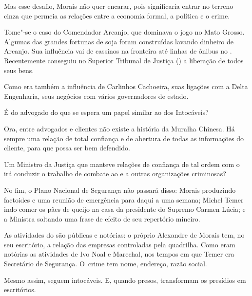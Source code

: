 Mas esse desafio, Morais não quer encarar, pois significaria entrar no
terreno cinza que permeia as relações entre a economia formal, a
política e o crime.

Tome"-se o caso do Comendador Arcanjo, que dominava o jogo no Mato
Grosso. Algumas das grandes fortunas de soja foram construídas lavando
dinheiro de Arcanjo. Sua influência vai de cassinos na fronteira até
linhas de ônibus no . Recentemente conseguiu no Superior Tribunal de
Justiça () a liberação de todos seus bens.

Como era também a influência de Carlinhos Cachoeira, suas ligações com a
Delta Engenharia, seus negócios com vários governadores de estado.

É do advogado do  que se espera um papel similar ao dos Intocáveis?

Ora, entre advogados e clientes não existe a história da Muralha
Chinesa. Há sempre uma relação de total confiança e de abertura de todas
as informações do cliente, para que possa ser bem defendido.

Um Ministro da Justiça que manteve relações de confiança de tal ordem
com o  irá conduzir o trabalho de combate ao  e a outras
organizações criminosas?

No fim, o Plano Nacional de Segurança não passará disso: Morais
produzindo factoides e uma reunião de emergência para daqui a uma
semana; Michel Temer indo comer os pães de queijo na casa da presidente
do Supremo Carmen Lúcia; e a Ministra soltando uma frase de efeito de
seu repertório mineiro.

As atividades do  são públicas e notórias: o próprio Alexandre de
Morais tem, no seu escritório, a relação das empresas controladas pela
quadrilha. Como eram notórias as atividades de Ivo Noal e Marechal, nos
tempos em que Temer era Secretário de Segurança. O~crime tem nome,
endereço, razão social.

Mesmo assim, seguem intocáveis. E, quando presos, transformam os
presídios em escritórios.
